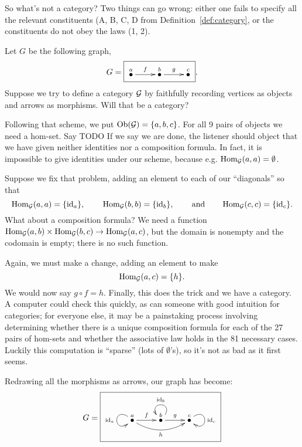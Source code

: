 \documentclass[CT4S-EN-RU]{subfiles}
\begin{document}
\begin{exampleENG}
So what's not a category? Two things can go wrong: either one fails to specify all the relevant constituents (A, B, C, D from Definition~\ref{def:category}, or the constituents do not obey the laws (1, 2).

Let $G$ be the following graph,
$$G=\fbox{\xymatrix{\LMO{a}\ar[r]^f&\LMO{b}\ar[r]^g&\LMO{c}}}.$$
Suppose we try to define a category $\mathcal{G}$ by faithfully recording vertices as objects and arrows as morphisms. Will that be a category?

Following that scheme, we put $\textnormal{Ob}(\mathcal{G})=\{a,b,c\}$. For all 9 pairs of objects we need a hom-set.
Say 
TODO%
If we say we are done, the listener should object that we have given neither identities nor a composition formula. In fact, it is impossible to give identities under our scheme, because e.g. $\textnormal{Hom}_\mathcal{G}(a,a)=\emptyset$.

Suppose we fix that problem, adding an element to each of our “diagonals” so that 
$$\textnormal{Hom}_\mathcal{G}(a,a)=\{\textnormal{id}_a\},\hspace{.3in}\textnormal{Hom}_\mathcal{G}(b,b)=\{\textnormal{id}_b\},\hspace{.3in}\textnormal{and}\hspace{.3in}\textnormal{Hom}_\mathcal{G}(c,c)=\{\textnormal{id}_c\}.$$ What about a composition formula? We need a function $\textnormal{Hom}_\mathcal{G}(a,b)\times\textnormal{Hom}_\mathcal{G}(b,c)\rightarrow\textnormal{Hom}_\mathcal{G}(a,c)$, but the domain is nonempty and the codomain is empty; there is no such function. 

Again, we must make a change, adding an element to make $$\textnormal{Hom}_\mathcal{G}(a,c)=\{h\}.$$ We would now say $g\circ f=h$. Finally, this does the trick and we have a category. A computer could check this quickly, as can someone with good intuition for categories; for everyone else, it may be a painstaking process involving determining whether there is a unique composition formula for each of the 27 pairs of hom-sets and whether the associative law holds in the 81 necessary cases. Luckily this computation is “sparse” (lots of $\emptyset$'s), so it's not as bad as it first seems.

Redrawing all the morphisms as arrows, our graph has become:
$$G=\fbox{\xymatrix{\LMO{a}\ar@(ul,dl)[]_{\id_a}\ar[r]^f\ar@/_1pc/[rr]_h&\LMO{b}\ar@(ur,ul)[]_{\id_b}\ar[r]^g&\LMO{c}\ar@(ur,dr)[]^{\id_c}}}$$
\end{exampleENG}

\begin{exampleRUS}
\end{exampleRUS}
\end{document}
